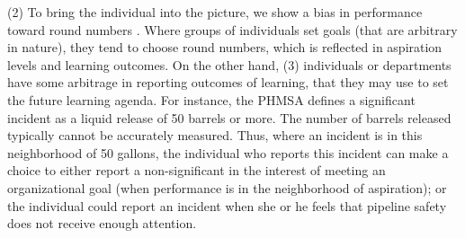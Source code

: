 \documentclass[12pt, man, natbib]{apa6}
\begin{document}
	(2) To bring the individual into the picture, we show a bias in performance toward round numbers \citet{Pope2011}. Where groups of individuals set goals (that are arbitrary in nature), they tend to choose round numbers, which is reflected in aspiration levels and learning outcomes. On the other hand, (3) individuals or departments have some arbitrage in reporting outcomes of learning, that they may use to set the future learning agenda. For instance, the PHMSA defines a significant incident as a liquid release of 50 barrels or more. The number of barrels released typically cannot be accurately measured. Thus, where an incident is in this neighborhood of 50 gallons, the individual who reports this incident can make a choice to either report a non-significant in the interest of meeting an organizational goal (when performance is in the neighborhood of aspiration); or the individual could report an incident when she or he feels that pipeline safety does not receive enough attention.
	

\end{document}
